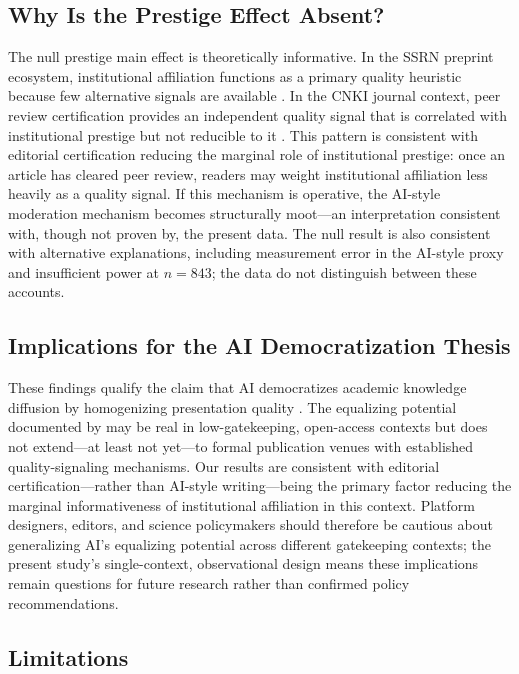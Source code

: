 \documentclass[12pt,a4paper]{article}
\begin{document}
\subsection{Why Is the Prestige Effect Absent?}

The null prestige main effect is theoretically informative.
In the SSRN preprint ecosystem, institutional affiliation functions as
a primary quality heuristic because few alternative signals are
available \citep{JoLi2026}.
In the CNKI journal context, peer review certification provides an
independent quality signal that is correlated with institutional
prestige but not reducible to it \citep{Bornmann2008}.
This pattern is consistent with editorial certification reducing the
marginal role of institutional prestige: once an article has cleared
peer review, readers may weight institutional affiliation less heavily
as a quality signal.
If this mechanism is operative, the AI-style moderation mechanism
becomes structurally moot---an interpretation consistent with, though
not proven by, the present data.
The null result is also consistent with alternative explanations,
including measurement error in the AI-style proxy and insufficient
power at $n=843$; the data do not distinguish between these accounts.

\subsection{Implications for the AI Democratization Thesis}

These findings qualify the claim that AI democratizes academic
knowledge diffusion by homogenizing presentation quality
\citep{Liang2024}.
The equalizing potential documented by \citet{JoLi2026} may be
real in low-gatekeeping, open-access contexts but does not extend---at
least not yet---to formal publication venues with established
quality-signaling mechanisms.
Our results are consistent with editorial certification---rather than
AI-style writing---being the primary factor reducing the marginal
informativeness of institutional affiliation in this context.
Platform designers, editors, and science policymakers should therefore
be cautious about generalizing AI's equalizing potential across
different gatekeeping contexts; the present study's single-context,
observational design means these implications remain questions for
future research rather than confirmed policy recommendations.

\subsection{Limitations}
\end{document}
